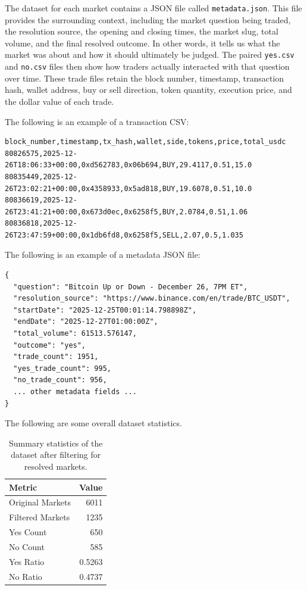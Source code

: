 \documentclass[11pt]{article}
\begin{document}
The dataset for each market contains a JSON file called \texttt{metadata.json}. This file provides the surrounding context, including the market question being traded, the resolution source, the opening and closing times, the market slug, total volume, and the final resolved outcome. In other words, it tells us what the market was about and how it should ultimately be judged. The paired \texttt{yes.csv} and \texttt{no.csv} files then show how traders actually interacted with that question over time. These trade files retain the block number, timestamp, transaction hash, wallet address, buy or sell direction, token quantity, execution price, and the dollar value of each trade.

The following is an example of a transaction CSV:

\begin{lstlisting}[caption={Example transaction CSV used in the dataset.},label={lst:csv_example}]
block_number,timestamp,tx_hash,wallet,side,tokens,price,total_usdc
80826575,2025-12-26T18:06:33+00:00,0xd562783,0x06b694,BUY,29.4117,0.51,15.0
80835449,2025-12-26T23:02:21+00:00,0x4358933,0x5ad818,BUY,19.6078,0.51,10.0
80836619,2025-12-26T23:41:21+00:00,0x673d0ec,0x6258f5,BUY,2.0784,0.51,1.06
80836818,2025-12-26T23:47:59+00:00,0x1db6fd8,0x6258f5,SELL,2.07,0.5,1.035
\end{lstlisting}

The following is an example of a metadata JSON file:

\begin{lstlisting}[caption={Example market metadata JSON.},label={lst:json_example}]
{
  "question": "Bitcoin Up or Down - December 26, 7PM ET",
  "resolution_source": "https://www.binance.com/en/trade/BTC_USDT",
  "startDate": "2025-12-25T00:01:14.798898Z",
  "endDate": "2025-12-27T01:00:00Z",
  "total_volume": 61513.576147,
  "outcome": "yes",
  "trade_count": 1951,
  "yes_trade_count": 995,
  "no_trade_count": 956,
  ... other metadata fields ...
}
\end{lstlisting}

The following are some overall dataset statistics.

\begin{table}[ht!]
\centering
\caption{Summary statistics of the dataset after filtering for resolved markets.}
\label{tab:dataset_summary}
\begin{tabular}{@{}lr@{}}
\toprule
Metric & Value \\
\midrule
Original Markets & 6011 \\
Filtered Markets & 1235 \\
Yes Count & 650 \\
No Count & 585 \\
Yes Ratio & 0.5263 \\
No Ratio & 0.4737 \\
\bottomrule
\end{tabular}
\end{table}
\end{document}
